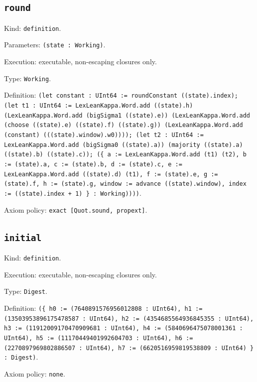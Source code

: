 \documentclass[11pt]{article}
\begin{document}
\subsection*{\texttt{round}}
\noindent Kind: \texttt{definition}.\par
\noindent Parameters: \texttt{(state : Working)}.\par
\noindent Execution: executable, non-escaping closures only.\par
\noindent Type: \texttt{Working}.\par
\noindent Definition: \texttt{(let constant : UInt64 := roundConstant ((state).index); (let t1 : UInt64 := LexLeanKappa.Word.add ((state).h) (LexLeanKappa.Word.add (bigSigma1 ((state).e)) (LexLeanKappa.Word.add (choose ((state).e) ((state).f) ((state).g)) (LexLeanKappa.Word.add (constant) (((state).window).w0)))); (let t2 : UInt64 := LexLeanKappa.Word.add (bigSigma0 ((state).a)) (majority ((state).a) ((state).b) ((state).c)); (\{ a := LexLeanKappa.Word.add (t1) (t2), b := (state).a, c := (state).b, d := (state).c, e := LexLeanKappa.Word.add ((state).d) (t1), f := (state).e, g := (state).f, h := (state).g, window := advance ((state).window), index := ((state).index + 1) \} : Working))))}.\par
\noindent Axiom policy: \texttt{exact [Quot.sound, propext]}.\par
\subsection*{\texttt{initial}}
\noindent Kind: \texttt{definition}.\par
\noindent Execution: executable, non-escaping closures only.\par
\noindent Type: \texttt{Digest}.\par
\noindent Definition: \texttt{(\{ h0 := (7640891576956012808 : UInt64), h1 := (13503953896175478587 : UInt64), h2 := (4354685564936845355 : UInt64), h3 := (11912009170470909681 : UInt64), h4 := (5840696475078001361 : UInt64), h5 := (11170449401992604703 : UInt64), h6 := (2270897969802886507 : UInt64), h7 := (6620516959819538809 : UInt64) \} : Digest)}.\par
\noindent Axiom policy: \texttt{none}.\par
\end{document}
